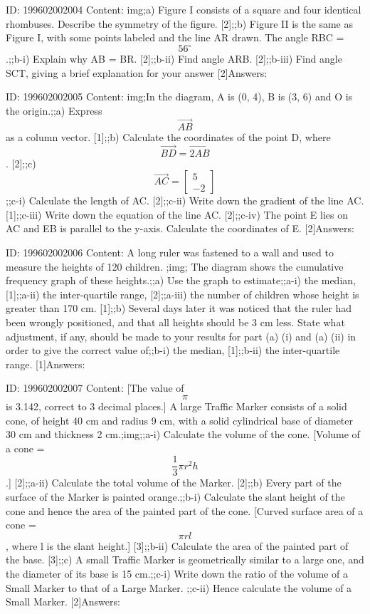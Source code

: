 \documentclass{article}
\begin{document}
ID: 199602002004
Content:
img;a) Figure I consists of a square and four identical rhombuses. Describe the symmetry of the figure. [2];;b) Figure II is the same as Figure I, with some points labeled and the line AR drawn. The angle RBC = $$56^{\circ}$$.;;b-i) Explain why AB = BR. [2];;b-ii) Find angle ARB. [2];;b-iii) Find angle SCT, giving a brief explanation for your answer [2]Answers:

ID: 199602002005
Content:
img;In the diagram, A is (0, 4), B is (3, 6) and O is the origin.;;a) Express $$\vec{AB}$$ as a column vector. [1];;b) Calculate the coordinates of the point D, where $$\vec{BD}  = \vec{2AB}$$. [2];;c) $$\vec{AC} = \begin{bmatrix}5\\-2\end{bmatrix}$$;;c-i) Calculate the length of AC. [2];;c-ii) Write down the gradient of the line AC. [1];;c-iii) Write down the equation of the line AC. [2];;c-iv) The point E lies on AC and EB is parallel to the y-axis. Calculate the coordinates of E. [2]Answers:

ID: 199602002006
Content:
A long ruler was fastened to a wall and used to measure the heights of 120 children. ;img; The diagram shows the cumulative frequency graph of these heights.;;a) Use the graph to estimate;;a-i) the median, [1];;a-ii)  the inter-quartile range, [2];;a-iii) the number of children whose height is greater than 170 cm. [1];;b) Several days later it was noticed that the ruler had been wrongly positioned, and that all heights should be 3 cm less. State what adjustment, if any, should be made to your results for part (a) (i) and (a) (ii) in order to give the correct value of;;b-i) the median, [1];;b-ii) the inter-quartile range. [1]Answers:

ID: 199602002007
Content:
[The value of $$\pi$$ is 3.142, correct to 3 decimal places.] A large Traffic Marker consists of a solid cone, of height 40 cm and radius 9 cm, with a solid cylindrical base of diameter 30 cm and thickness 2 cm.;img;;a-i) Calculate the volume of the cone. [Volume of a cone = $$\frac{1}{3} \pi r^2h$$.] [2];;a-ii) Calculate the total volume of the Marker. [2];;b) Every part of the surface of the Marker is painted orange.;;b-i) Calculate the slant height of the cone and hence the area of the painted part of the cone. [Curved surface area of a cone = $$\pi r l$$, where l is the slant height.] [3];;b-ii) Calculate the area of the painted part of the base. [3];;c) A small Traffic Marker is geometrically similar to a large one, and the diameter of its base is 15 cm.;;c-i) Write down the ratio of the volume of a Small Marker to that of a Large Marker. ;;c-ii) Hence calculate the volume of a Small Marker. [2]Answers:
\end{document}
